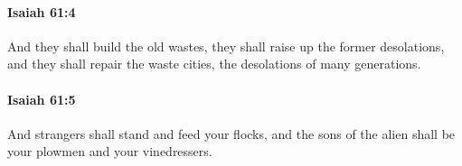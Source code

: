 		\paragraph{Isaiah 61:4} %
			\label{ISAIAH-61-4}

			And they shall build the old wastes, they shall raise up the former desolations, and they shall repair the waste cities, the desolations of many generations.


		\paragraph{Isaiah 61:5} %
			\label{ISAIAH-61-5}

			And strangers shall stand and feed your flocks, and the sons of the alien shall be your plowmen and your vinedressers.


